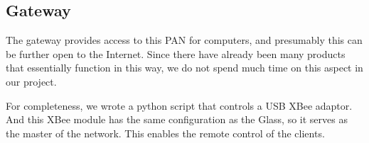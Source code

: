 \subsection{Gateway}
\label{sec:gateway}

The gateway provides access to this PAN for computers, and presumably this can be further open to the Internet. Since there have already been many products \cite{NinjaBlocks, Lockitron} that essentially function in this way, we do not spend much time on this aspect in our project. 

For completeness, we wrote a python script that controls a USB XBee adaptor. And this XBee module has the same configuration as the Glass, so it serves as the master of the network. This enables the remote control of the clients.


